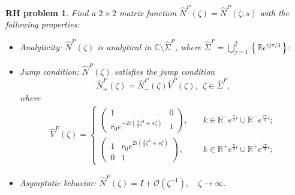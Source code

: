 \documentclass[11pt]{article}
\numberwithin{equation}{section}
\newtheorem{RHP}{RH problem}
\begin{document}
\begin{RHP}\label{rhp23}
     Find  a $2\times2$ matrix function $ \widehat  N^{P} ( \zeta)=\widehat N^{P} (\zeta;s )$ with the following properties:
    \begin{itemize}
        \item Analyticity: $\widehat N^{P}( \zeta)$ is analytical in $\mathbb{C}\setminus  \widehat \Sigma^{P} $, where $\widehat \Sigma^{P}=\displaystyle\bigcup_{j=1}^2 \left\{\mathbb{R} e^{i j\pi/3 }  \right\}; $
        \item Jump condition: $\widehat N^{P}( \zeta)$ satisfies the  jump condition \begin{equation*}
           \widehat N^{P}_+( \zeta)=\widehat N^{P}_-(\zeta) \widehat V^{P}(\zeta), \ \ \zeta\in \widehat \Sigma^{P},
        \end{equation*}
        where
       \begin{align}
       \widehat V^{P}(\zeta)= \begin{cases}
        \left( \begin{array}{cc}
       		1& 0\\
       	\bar r_0 e^{-2i \left(\frac{4}{3}  \zeta^3 +  s\zeta \right) }	& 1
       	\end{array}\right),\quad& k\in \mathbb{R}^- e^{ \frac{\pi}{3} i  }\cup \mathbb{R}^- e^{ \frac{2\pi}{3} i  };\\
         \left(	\begin{array}{cc}
       			1&  r_0 e^{2i \left(\frac{4}{3}  \zeta^3 +  s\zeta \right)  }   \\
       			0 & 1
       		\end{array}\right),\quad &k \in  \mathbb{R}^+ e^{ \frac{\pi}{3} i  }\cup \mathbb{R}^+ e^{ \frac{2\pi}{3} i  };
       	\end{cases}
       \end{align}
        \item Asymptotic behavior:  $\widehat N^{P}( \zeta)=I+\mathcal{O}(\zeta ^{-1}),	\quad \zeta \to  \infty. $

\end{itemize}
\end{RHP}
\end{document}
